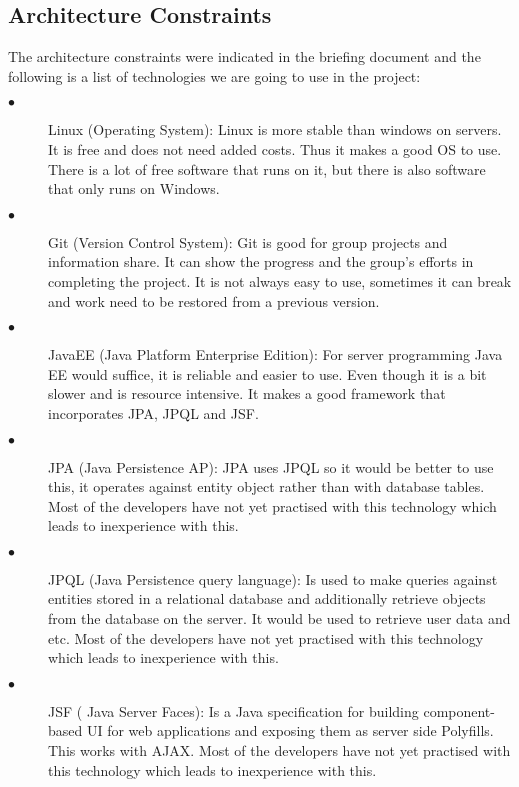 \documentclass[12pt]{article}
\begin{document}
\subsection{Architecture Constraints}

The architecture constraints were indicated in the briefing document and the following is a list of technologies we are going to use in the project:

\begin{description}
  \item[$\bullet$] Linux (Operating System):
  Linux is more stable than windows on servers. It is free and does not need added costs. Thus it makes a good OS to use. There is a lot of free software that runs on it, but there is also software that only runs on Windows. 
  
  \item[$\bullet$] Git (Version Control System):
  Git is good for group projects and information share. It can show the progress and the group’s efforts in completing the project. It is not always easy to use, sometimes it can break and work need to be restored from a previous version.
  
  \item[$\bullet$] JavaEE (Java Platform Enterprise Edition):
  For server programming Java EE would suffice, it is reliable and easier to use. Even though it is a bit slower and is resource intensive. It makes a good framework that incorporates JPA,  JPQL and JSF.
  
  \item[$\bullet$]JPA (Java Persistence AP):
  JPA uses JPQL so it would be better to use this, it operates against entity object rather than with database tables. Most of the developers have not yet practised with this technology which leads to inexperience with this. 
  
  \item[$\bullet$] JPQL (Java Persistence query language):
  Is used to make queries against entities stored in a relational database and additionally retrieve objects from the database on the server. It would be used to retrieve user data and etc. Most of the developers have not yet practised with this technology which leads to inexperience with this. 
  
  \item[$\bullet$] JSF ( Java Server Faces):
  Is a Java specification for building component-based UI for web applications and exposing them as server side Polyfills. This works with AJAX. Most of the developers have not yet practised with this technology which leads to inexperience with this. 
  

\end{description}
\end{document}
